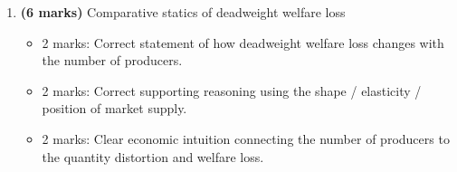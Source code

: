 \documentclass[12pt]{article}
\begin{document}
\begin{enumerate}[label=(\alph*)]
    \item \textbf{(6 marks)} Comparative statics of deadweight welfare loss
    \begin{itemize}
        \item 2 marks: Correct statement of how deadweight welfare loss changes with the number of producers.
        \item 2 marks: Correct supporting reasoning using the shape / elasticity / position of market supply.
        \item 2 marks: Clear economic intuition connecting the number of producers to the quantity distortion and welfare loss.
    \end{itemize}
\end{enumerate}
\end{document}
